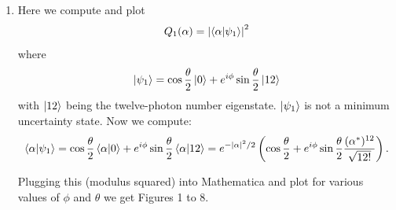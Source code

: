 \documentclass{article}
\theoremstyle{definition}
\newcommand{\al}{\alpha}
\newcommand{\f}[2]{\frac{#1}{#2}}
\newcommand{\lp}{\left(}
\newcommand{\rp}{\right)}
\begin{document}
\begin{enumerate}[label=\alph*)]
	\item Here we compute and plot 
	\begin{align*}
		Q_1(\al) = \abs{\braket{\al}{\psi_1}}^2
	\end{align*}
	where
	\begin{align*}
		\ket{\psi_1} = \cos \f{\theta}{2} \ket{0} + e^{i\phi} \sin\f{\theta}{2}\ket{12}
	\end{align*}
	with $\ket{12}$ being the twelve-photon number eigenstate. $\ket{\psi_1}$ is not a minimum uncertainty state. Now we compute:
	\begin{align*}
		\braket{\al}{\psi_1} = \cos\f{\theta}{2} \braket{\al}{0} + e^{i\phi}\sin\f{\theta}{2} \braket{\al}{12} = e^{-\abs{\al}^2/2}\lp \cos\f{\theta}{2}  + e^{i\phi} \sin\f{\theta}{2} \f{(\al^*)^{12}}{\sqrt{12!}} \rp.
	\end{align*}
	
	Plugging this (modulus squared) into Mathematica and plot for various values of $\phi$ and $\theta$ we get Figures 1 to 8.
	

\end{enumerate}
\end{document}
